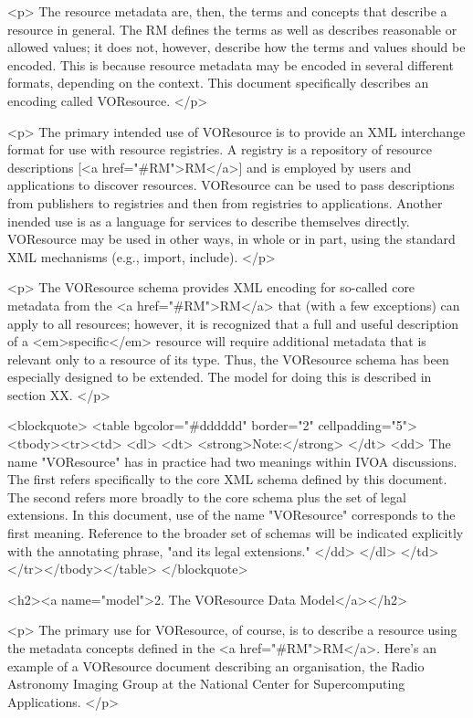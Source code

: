 \documentclass[11pt,a4paper]{ivoa}
\begin{document}
<p>
The resource metadata are, then, the terms and concepts that describe
a resource in general.  The RM defines the terms as well as describes
reasonable or allowed values; it does not, however, describe how the
terms and values should be encoded.  This is because resource metadata
may be encoded in several different formats, depending on the
context.  This document specifically describes an encoding called
VOResource.  
</p>

<p>
The primary intended use of VOResource is to provide an XML
interchange format for use with resource registries.  A registry is a
repository of resource descriptions [<a href="#RM">RM</a>] and is
employed by users and applications to discover resources.  VOResource
can be used to pass descriptions from publishers to registries and
then from registries to applications.  Another inended use is as a
language for services to describe themselves directly.  VOResource 
may be used in other ways, in whole or in part, using the standard XML
mechanisms (e.g., import, include).  
</p>

<p>
The VOResource schema provides XML encoding for so-called core
metadata from the <a href="#RM">RM</a> that (with a few exceptions)
can apply to all resources; however, it is recognized that a full and
useful description of a <em>specific</em> resource will require
additional metadata that is relevant only to a resource of its type.
Thus, the VOResource schema has been especially designed to be
extended.  The model for doing this is described in section XX.
</p>

<blockquote>
<table bgcolor="#dddddd" border="2" cellpadding="5"><tbody><tr><td>
<dl>
  <dt> <strong>Note:</strong> </dt>
  <dd> The name "VOResource" has in practice had two meanings within
       IVOA discussions.  The first refers specifically to the core
       XML schema defined by this document.  The second refers more
       broadly to the core schema plus the set of legal extensions.
       In this document, use of the name "VOResource" corresponds to
       the first meaning.  Reference to the broader set of schemas
       will be indicated explicitly with the annotating phrase, "and
       its legal extensions."  </dd>
</dl>
</td></tr></tbody></table>
</blockquote>

<h2><a name="model">2. The VOResource Data Model</a></h2>

<p>
The primary use for VOResource, of course, is to describe a resource
using the metadata concepts defined in the <a href="#RM">RM</a>.  
Here's an example of a VOResource document describing an organisation,
the Radio Astronomy Imaging Group at the National Center for
Supercomputing Applications.  
</p>
\end{document}
